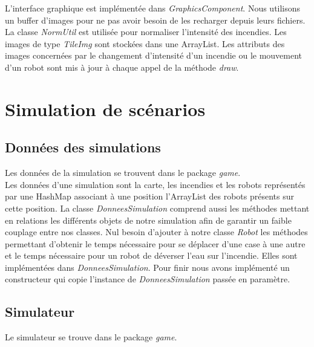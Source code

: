 \documentclass[a4paper, 10pt, french]{article}
\begin{document}
	L'interface graphique est implémentée dans {\it GraphicsComponent}. Nous utilisons un buffer d'images pour ne pas avoir besoin de les recharger depuis leurs fichiers. La classe {\it NormUtil} est utilisée pour normaliser l'intensité des incendies. Les images de type {\it TileImg} sont stockées dans une ArrayList. Les attributs des images concernées par le changement d'intensité d'un incendie ou le mouvement d'un robot sont mis à jour à chaque appel de la méthode {\it draw}.

\section{Simulation de scénarios}

	\subsection{Données des simulations}
	\noindent Les données de la simulation se trouvent dans le package {\it game}. \\

	Les données d'une simulation sont la carte, les incendies et les robots représentés par une HashMap associant à une position l'ArrayList des robots présents sur cette position. La classe {\it DonneesSimulation} comprend aussi les méthodes mettant en relations les différents objets de notre simulation afin de garantir un faible couplage entre nos classes. Nul besoin d'ajouter à notre classe {\it Robot} les méthodes permettant d'obtenir le temps nécessaire pour se déplacer d'une case à une autre et le temps nécessaire pour un robot de déverser l'eau sur l'incendie. Elles sont implémentées dans {\it DonneesSimulation}. Pour finir nous avons implémenté un constructeur qui copie l'instance de {\it DonneesSimulation} passée en paramètre. 
	
	\subsection{Simulateur}
	\noindent Le simulateur se trouve dans le package {\it game}. \\
\end{document}

